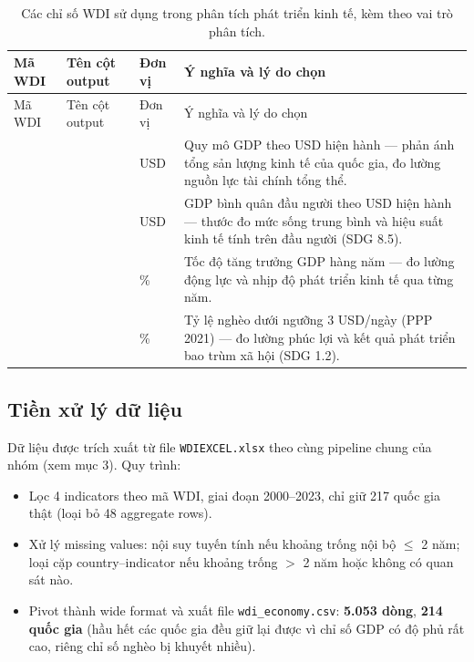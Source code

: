 \begin{longtable}{L{3.8cm}L{3.5cm}L{1.3cm}L{5cm}}
\caption{Các chỉ số WDI sử dụng trong phân tích phát triển kinh tế, kèm theo vai trò phân tích.}
\label{tab:economy-indicators}\\
\toprule
Mã WDI & Tên cột output & Đơn vị & Ý nghĩa và lý do chọn \\
\midrule
\endfirsthead
\toprule
Mã WDI & Tên cột output & Đơn vị & Ý nghĩa và lý do chọn \\
\midrule
\endhead
{} &  & USD & Quy mô GDP theo USD hiện hành --- phản ánh tổng sản lượng kinh tế của quốc gia, đo lường nguồn lực tài chính tổng thể. \\
 &  & USD & GDP bình quân đầu người theo USD hiện hành --- thước đo mức sống trung bình và hiệu suất kinh tế tính trên đầu người (SDG 8.5). \\
 &  & \% & Tốc độ tăng trưởng GDP hàng năm --- đo lường động lực và nhịp độ phát triển kinh tế qua từng năm. \\
 &  & \% & Tỷ lệ nghèo dưới ngưỡng 3 USD/ngày (PPP 2021) --- đo lường phúc lợi và kết quả phát triển bao trùm xã hội (SDG 1.2). \\
\bottomrule
\end{longtable}

\subsection{Tiền xử lý dữ liệu}

Dữ liệu được trích xuất từ file \texttt{WDIEXCEL.xlsx} theo cùng pipeline chung của nhóm (xem mục 3). Quy trình:
\begin{itemize}
    \item Lọc 4 indicators theo mã WDI, giai đoạn 2000--2023, chỉ giữ 217 quốc gia thật (loại bỏ 48 aggregate rows).
    \item Xử lý missing values: nội suy tuyến tính nếu khoảng trống nội bộ $\leq$ 2 năm; loại cặp country--indicator nếu khoảng trống $>$ 2 năm hoặc không có quan sát nào.
    \item Pivot thành wide format và xuất file \texttt{wdi\_economy.csv}: \textbf{5.053 dòng}, \textbf{214 quốc gia} (hầu hết các quốc gia đều giữ lại được vì chỉ số GDP có độ phủ rất cao, riêng chỉ số nghèo bị khuyết nhiều).
\end{itemize}

